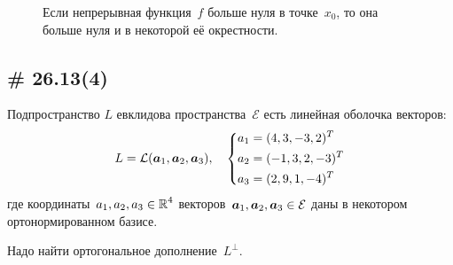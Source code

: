 \documentclass[a4paper,12pt]{article}
\begin{document}
\begin{solution}
\begin{figure}[h!]
      \caption{Если непрерывная функция~$f$ больше нуля в точке~$x_0$, то она больше нуля и в некоторой её окрестности.}
      \label{fig:x0-neighbourhood}
    \end{figure}
  \end{solution}
  
  
  \subsection{\# 26.13(4)}
  
  Подпространство $L$ евклидова пространства~$\mathcal E$ есть линейная оболочка векторов:
  \[
    L = \mathcal L(\boldsymbol a_1, \boldsymbol a_2, \boldsymbol a_3),
    \quad\left\{
      \begin{aligned}
        &a_1 = (4, 3, -3, 2)^T\\
        &a_2 = (-1, 3, 2, -3)^T\\
        &a_3 = (2, 9, 1, -4)^T
      \end{aligned}
    \right.
  \]
  где координаты~$a_1, a_2, a_3 \hm\in \RR^4$ векторов~$\bds a_1, \bds a_2, \bds a_3 \hm\in \mathcal E$ даны в некотором ортонормированном базисе.
  
  Надо найти ортогональное дополнение~$L^{\perp}$.
  
\end{document}

